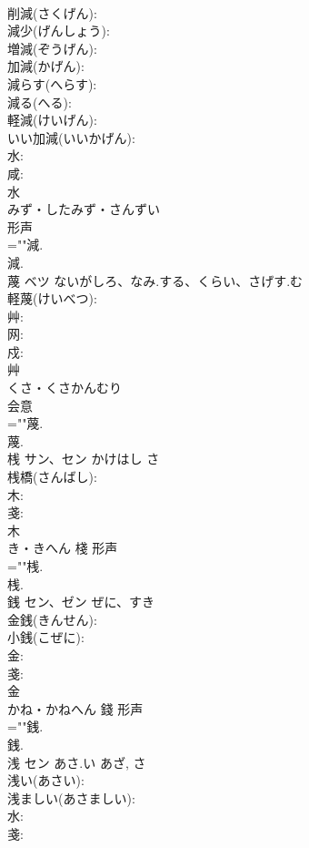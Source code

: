 \documentclass[8pt]{extreport}
\begin{document}
\begin{CJK}{UTF8}{min}
\\	削減(さくげん): 
\\	減少(げんしょう): 
\\	増減(ぞうげん): 
\\	加減(かげん): 
\\	減らす(へらす): 
\\	減る(へる): 
\\	軽減(けいげん): 
\\	いい加減(いいかげん): 
\\	水: 
\\	咸: 
\\	水	
\\	みず・したみず・さんずい	
\\	形声 
\\	=""減.
\\	減.
\\	蔑	ベツ	ないがしろ、なみ.する、くらい、さげす.む		
\\	軽蔑(けいべつ): 
\\	艸: 
\\	网: 
\\	戍: 
\\	艸	
\\	くさ・くさかんむり	
\\	会意 
\\	=""蔑.
\\	蔑.
\\	桟	サン、セン	かけはし	さ	
\\	桟橋(さんばし): 
\\	木: 
\\	戔: 
\\	木	
\\	き・きへん	棧	形声 
\\	=""桟.
\\	桟.
\\	銭	セン、ゼン	ぜに、すき		
\\	金銭(きんせん): 
\\	小銭(こぜに): 
\\	金: 
\\	戔: 
\\	金	
\\	かね・かねへん	錢	形声 
\\	=""銭.
\\	銭.
\\	浅	セン	あさ.い	あざ, さ	
\\	浅い(あさい): 
\\	浅ましい(あさましい): 
\\	水: 
\\	戔: 

\end{CJK}
\end{document}
